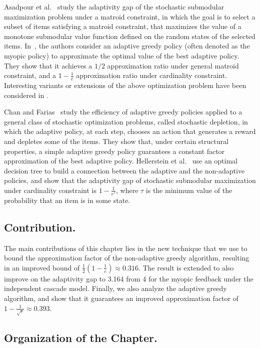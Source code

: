 Asadpour et al.~\cite{Asadpour16, DBLP:conf/wine/AsadpourNS08} study the adaptivity gap of the stochastic submodular maximization problem under a matroid constraint, in which the goal is to select a subset of items satisfying a matroid constraint, that maximizes the value of a monotone submodular value function defined on the random states of the selected items. In~\cite{Asadpour16}, the authors consider an adaptive greedy policy (often denoted as the myopic policy) to approximate the optimal value of the best adaptive policy. They show that it achieves a $1/2$ approximation ratio under general matroid constraint, and a $1-\frac{1}{e}$ approximation ratio  under cardinality constraint. Interesting variants or extensions of the above optimization problem have been  considered in \cite{Bradac19,Gupta2016,Gupta2017}.

Chan and Farias~\cite{DBLP:journals/mor/ChanF09} study the efficiency of adaptive greedy policies applied to a general class of stochastic optimization problems, called stochastic depletion, in which the adaptive policy, at each step, chooses an action that generates a reward and depletes some of the items. They show that, under certain structural properties, a simple adaptive greedy policy guarantees a constant factor approximation of the best adaptive policy. Hellerstein et al.~\cite{DBLP:conf/ciac/HellersteinKL15} use an optimal decision tree to build a connection between the adaptive and the non-adaptive policies, and show that the adaptivity gap of stochastic submodular maximization under cardinality constraint is $1-\frac{1}{e^\tau}$, where $\tau$ is the minimum value of the probability that an  item is in some state. 

\subsection*{Contribution.}

The main contributions of this chapter lies in the new technique that we use to bound the approximation factor of the non-adaptive greedy algorithm, resulting in an improved bound of $\frac{1}{2}\left(1-\frac{1}{e}\right) \approx 0.316.$ The result is extended to also improve on the adaptivity gap to 3.164 from 4 for the myopic feedback under the independent cascade model. Finally, we also analyze the adaptive greedy algorithm, and show that it guarantees an improved approximation factor of  $1-\frac{1}{\sqrt{e}}\approx 0.393$.

\subsection*{Organization of the Chapter.}

